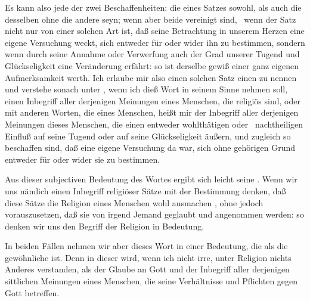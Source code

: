 \begin{aufza}
\item Es kann also jede der zwei Beschaffenheiten: die  eines Satzes sowohl, als auch die  desselben ohne die andere seyn; wenn aber beide vereinigt sind, \dh\ wenn der Satz nicht nur von einer solchen Art ist, daß seine Betrachtung in unserem Herzen eine eigene Versuchung weckt, sich entweder für oder wider ihn zu bestimmen, sondern wenn durch seine Annahme oder Verwerfung auch der Grad unserer Tugend und Glückseligkeit eine Veränderung erfährt: so ist derselbe gewiß einer ganz eigenen Aufmerksamkeit werth. Ich erlaube mir also einen solchen Satz einen  zu nennen und verstehe sonach unter , wenn ich dieß Wort in seinem  Sinne nehmen soll, einen Inbegriff aller derjenigen Meinungen eines Menschen, die religiös sind, oder mit anderen Worten, die  eines Menschen, heißt mir der Inbegriff aller derjenigen Meinungen dieses Menschen, die einen entweder wohlthätigen oder~ nachtheiligen Einfluß auf seine Tugend oder auf seine Glückseligkeit äußern, und zugleich so beschaffen sind, daß eine eigene Versuchung da war, sich ohne gehörigen Grund entweder für oder wider sie zu bestimmen.
\item Aus dieser subjectiven Bedeutung des Wortes ergibt sich leicht seine . Wenn wir uns nämlich einen Inbegriff religiöser Sätze mit der Bestimmung denken, daß diese Sätze die Religion eines Menschen wohl ausmachen , ohne jedoch vorauszusetzen, daß sie  von irgend Jemand geglaubt und angenommen werden: so denken wir uns den Begriff der Religion in  Bedeutung.
\item In beiden Fällen nehmen wir aber dieses Wort in einer Bedeutung, die  als die gewöhnliche ist. Denn in dieser wird, wenn ich nicht irre, unter Religion nichts Anderes verstanden, als der Glaube an Gott und der Inbegriff aller derjenigen sittlichen Meinungen eines Menschen, die seine Verhältnisse und Pflichten gegen Gott betreffen.
\end{aufza}

